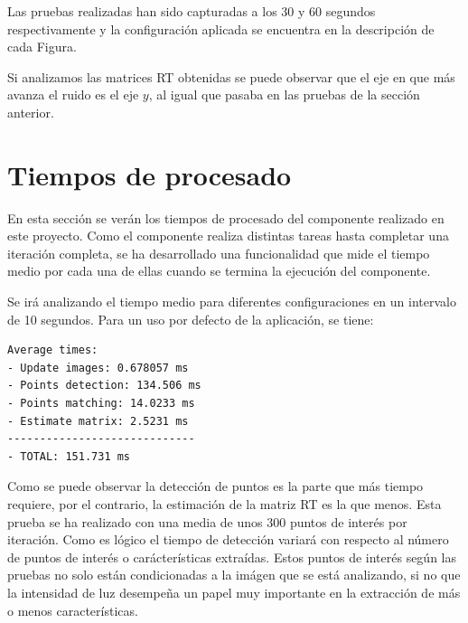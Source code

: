 %

Las pruebas realizadas han sido capturadas a los 30 y 60 segundos respectivamente y la configuración aplicada se encuentra en la descripción de cada Figura.

Si analizamos las matrices RT obtenidas se puede observar que el eje en que más avanza el ruido es el eje $y$, al igual que pasaba en las pruebas de la sección anterior.


\newpage
\section{Tiempos de procesado}
En esta sección se verán los tiempos de procesado del componente realizado en este proyecto. Como el componente realiza distintas tareas hasta completar una iteración completa, se ha desarrollado una funcionalidad que mide el tiempo medio por cada una de ellas cuando se termina la ejecución del componente.

Se irá analizando el tiempo medio para diferentes configuraciones en un intervalo de 10 segundos. Para un uso por defecto de la aplicación, se tiene:

\begin{lstlisting}[style=CStyle]
Average times:
- Update images: 0.678057 ms
- Points detection: 134.506 ms
- Points matching: 14.0233 ms
- Estimate matrix: 2.5231 ms
-----------------------------
- TOTAL: 151.731 ms
\end{lstlisting}

Como se puede observar la detección de puntos es la parte que más tiempo requiere, por el contrario, la estimación de la matriz RT es la que menos. Esta prueba se ha realizado con una media de unos 300 puntos de interés por iteración. Como es lógico el tiempo de detección variará con respecto al número de puntos de interés o carácterísticas extraídas. Estos puntos de interés según las pruebas no solo están condicionadas a la imágen que se está analizando, si no que la intensidad de luz desempeña un papel muy importante en la extracción de más o menos características.

